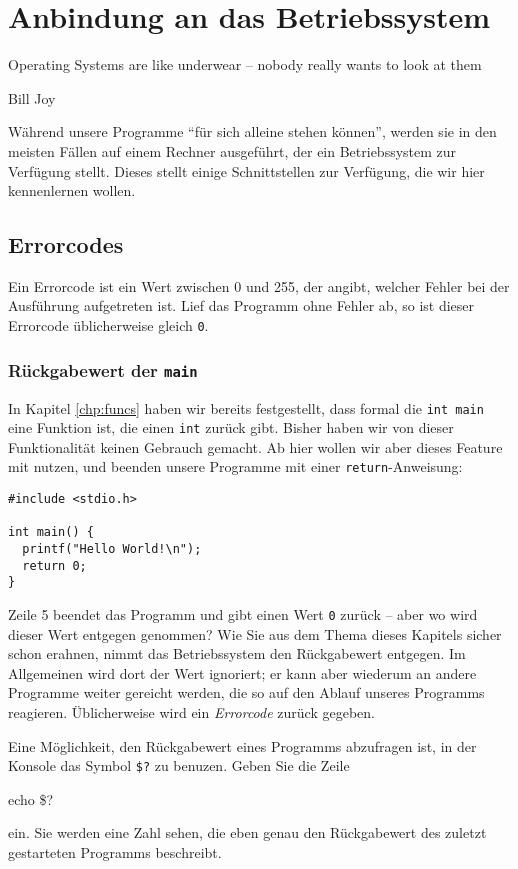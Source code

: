 \chapter{Anbindung an das Betriebssystem} \label{chp:OS-Link}
\epigraph{Operating Systems are like underwear -- nobody really wants to look at them}{Bill Joy}

Während unsere Programme \enquote{für sich alleine stehen können}, werden sie in den meisten Fällen auf einem Rechner ausgeführt, der ein Betriebssystem zur Verfügung stellt. Dieses stellt einige Schnittstellen zur Verfügung, die wir hier kennenlernen wollen.

\section{Errorcodes} \label{sec:errorcodes}
Ein Errorcode ist ein Wert zwischen 0 und 255, der angibt, welcher Fehler bei der Ausführung aufgetreten ist. Lief das Programm ohne Fehler ab, so ist dieser Errorcode üblicherweise gleich \texttt{0}.

\subsection{Rückgabewert der \texttt{main}}
In Kapitel \ref{chp:funcs} haben wir bereits festgestellt, dass formal die \texttt{int main} eine Funktion ist, die einen \texttt{int} zurück gibt. Bisher haben wir von dieser Funktionalität keinen Gebrauch gemacht. Ab hier wollen wir aber dieses Feature mit nutzen, und beenden unsere Programme mit einer \texttt{return}-Anweisung:
\begin{codebox}
\begin{verbatim}
#include <stdio.h>

int main() {
  printf("Hello World!\n");
  return 0;
}
\end{verbatim}
\end{codebox}

Zeile 5 beendet das Programm und gibt einen Wert \texttt{0} zurück -- aber wo wird dieser Wert entgegen genommen? Wie Sie aus dem Thema dieses Kapitels sicher schon erahnen, nimmt das Betriebssystem den Rückgabewert entgegen. Im Allgemeinen wird dort der Wert ignoriert; er kann aber wiederum an andere Programme weiter gereicht werden, die so auf den Ablauf unseres Programms reagieren. Üblicherweise wird ein \emph{Errorcode} zurück gegeben.

Eine Möglichkeit, den Rückgabewert eines Programms abzufragen ist, in der Konsole das Symbol \texttt{\$?} zu benuzen. Geben Sie die Zeile
\begin{cmdbox}
echo \$?
\end{cmdbox}
ein. Sie werden eine Zahl sehen, die eben genau den Rückgabewert des zuletzt gestarteten Programms beschreibt.

